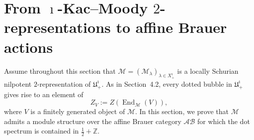 \documentclass[a4,10pt]{amsart}
\numberwithin{equation}{section}
\theoremstyle{definition}
\begin{document}
\section{From  $\imath$-Kac--Moody $2$-representations to affine Brauer actions}\label{ikmcmc}

Assume throughout this section that
\(\mathcal M=(\mathcal M_\lambda)_{\lambda\in X^\imath_+}\)
is a locally Schurian nilpotent \(2\)-representation of
\(\mathfrak U^\imath_+\).
As in Section~4.2, every dotted bubble in
\(\mathfrak U^\imath_+\) gives rise to an element of
\[
Z_V:=Z(\operatorname{End}_{\mathcal M}(V)),
\]
where \(V\) is a finitely generated object of \(\mathcal M\).
In this section, we prove that \(\mathcal M\) admits a module
structure over the affine Brauer category \(\mathcal{AB}\) for
which the dot spectrum is contained in
\(\frac12+\mathbb Z\).
\end{document}

